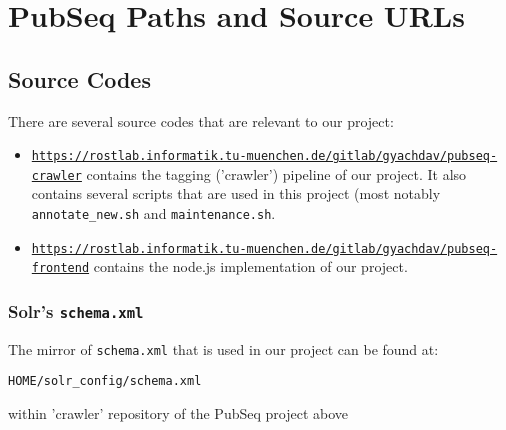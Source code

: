 
\chapter{PubSeq Paths and Source URLs} %

\label{AppendixA} %



\section{Source Codes}

There are several source codes that are relevant to our project:

\begin{itemize}
\item \href{https://rostlab.informatik.tu-muenchen.de/gitlab/gyachdav/pubseq-crawler}{\texttt{https://rostlab.informatik.tu-muenchen.de/gitlab/gyachdav/pubseq-crawler}} contains the tagging ('crawler') pipeline of our project. It also contains several scripts that are used in this project (most notably \texttt{annotate\_new.sh} and \texttt{maintenance.sh}.
\item \href{https://rostlab.informatik.tu-muenchen.de/gitlab/gyachdav/pubseq-frontend}{\texttt{https://rostlab.informatik.tu-muenchen.de/gitlab/gyachdav/pubseq-frontend}} contains the node.js implementation of our project.
\end{itemize}

\subsection{Solr's \texttt{schema.xml}}

\label{sec:SchemaXMLPath}

The mirror of \texttt{schema.xml} that is used in our project can be found at:

\begin{center}
\texttt{HOME/solr\_config/schema.xml}
\end{center}

within 'crawler' repository of the PubSeq project above


